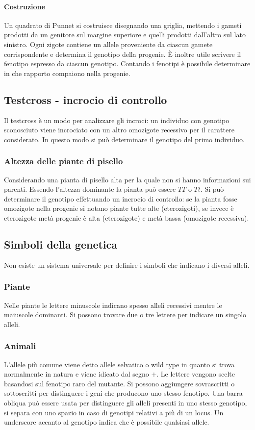 \paragraph{Costruzione}
Un quadrato di Punnet si costruisce disegnando una griglia, mettendo i gameti prodotti da un genitore sul margine superiore e quelli prodotti dall'altro sul lato sinistro. Ogni zigote contiene un
allele proveniente da ciascun gamete corrispondente e determina il genotipo della progenie. \`E inoltre utile scrivere il fenotipo espresso da ciascun genotipo. Contando i fenotipi \`e possibile 
determinare in che rapporto compaiono nella progenie.
\subsection{Testcross - incrocio di controllo}
Il testcross \`e un modo per analizzare gli incroci: un individuo con genotipo sconosciuto viene incrociato con un altro omozigote recessivo per il carattere considerato. In questo modo si pu\`o 
determinare il genotipo del primo individuo.
\subsubsection{Altezza delle piante di pisello}
Considerando una pianta di pisello alta per la quale non si hanno informazioni sui parenti. Essendo l'altezza dominante la pianta pu\`o essere $TT$ o $Tt$. Si pu\`o determinare il genotipo 
effettuando un incrocio di controllo: se la pianta fosse omozigote nella progenie si notano piante tutte alte (eterozigoti), se invece \`e eterozigote met\`a progenie \`e alta (eterozigote) e met\`a
bassa (omozigote recessiva). 
\subsection{Simboli della genetica}
Non esiste un sistema universale per definire i simboli che indicano i diversi alleli.
\subsubsection{Piante}
Nelle piante le lettere minuscole indicano spesso alleli recessivi mentre le maiuscole dominanti. Si possono trovare due o tre lettere per indicare un singolo alleli.
\subsubsection{Animali}
L'allele pi\`u comune viene detto allele selvatico o wild type in quanto si trova normalmente in natura e viene idicato dal segno $+$. Le lettere vengono scelte basandosi sul fenotipo raro del mutante. Si
possono aggiungere sovrascritti o sottoscritti per distinguere i geni che producono uno stesso fenotipo. Una barra obliqua pu\`o essere usata per distinguere gli alleli presenti in uno stesso genotipo, 
si separa con uno spazio in caso di genotipi relativi a pi\`u di un locus. Un underscore accanto al genotipo indica che \`e possibile qualsiasi allele. 
